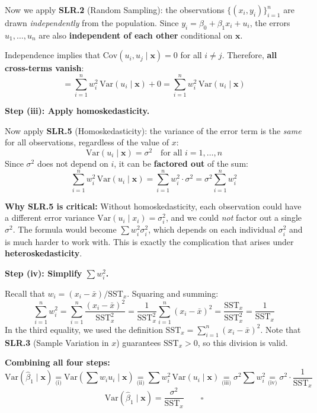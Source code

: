 \documentclass[11pt,a4paper]{article}
\begin{document}
\begin{enumerate}[label=(\alph*)]
\begin{solution}
Now we apply \textbf{SLR.2} (Random Sampling): the observations $\{(x_i, y_i)\}_{i=1}^n$ are drawn \emph{independently} from the population. Since $y_i = \beta_0 + \beta_1 x_i + u_i$, the errors $u_1, \ldots, u_n$ are also \textbf{independent of each other} conditional on $\mathbf{x}$.

Independence implies that $\text{Cov}(u_i, u_j \mid \mathbf{x}) = 0$ for all $i \ne j$. Therefore, \textbf{all cross-terms vanish}:
\[
  = \sum_{i=1}^n w_i^2\,\text{Var}(u_i \mid \mathbf{x}) + 0
  = \sum_{i=1}^n w_i^2\,\text{Var}(u_i \mid \mathbf{x})
\]

\bigskip

\textbf{Step (iii): Apply homoskedasticity.}

Now apply \textbf{SLR.5} (Homoskedasticity): the variance of the error term is the \emph{same} for all observations, regardless of the value of $x$:
\[
  \text{Var}(u_i \mid \mathbf{x}) = \sigma^2 \quad\text{for all } i = 1, \ldots, n
\]
Since $\sigma^2$ does not depend on $i$, it can be \textbf{factored out} of the sum:
\[
  \sum_{i=1}^n w_i^2\,\text{Var}(u_i \mid \mathbf{x})
  = \sum_{i=1}^n w_i^2 \cdot \sigma^2
  = \sigma^2 \sum_{i=1}^n w_i^2
\]

\textcolor{warncolor}{\textbf{Why SLR.5 is critical:}} Without homoskedasticity, each observation could have a different error variance $\text{Var}(u_i \mid x_i) = \sigma_i^2$, and we could \emph{not} factor out a single $\sigma^2$. The formula would become $\sum w_i^2 \sigma_i^2$, which depends on each individual $\sigma_i^2$ and is much harder to work with. This is exactly the complication that arises under \textbf{heteroskedasticity}.

\bigskip

\textbf{Step (iv): Simplify $\sum w_i^2$.}

Recall that $w_i = (x_i - \bar{x})/\text{SST}_x$. Squaring and summing:
\[
  \sum_{i=1}^n w_i^2
  = \sum_{i=1}^n \frac{(x_i - \bar{x})^2}{\text{SST}_x^2}
  = \frac{1}{\text{SST}_x^2} \sum_{i=1}^n (x_i - \bar{x})^2
  = \frac{\text{SST}_x}{\text{SST}_x^2}
  = \frac{1}{\text{SST}_x}
\]
In the third equality, we used the definition $\text{SST}_x = \sum_{i=1}^n (x_i - \bar{x})^2$. Note that \textbf{SLR.3} (Sample Variation in $x$) guarantees $\text{SST}_x > 0$, so this division is valid.

\bigskip

\textbf{Combining all four steps:}
\[
  \text{Var}(\hat{\beta}_1 \mid \mathbf{x})
  \underset{\text{(i)}}{=} \text{Var}\!\left(\sum w_i u_i \mid \mathbf{x}\right)
  \underset{\text{(ii)}}{=} \sum w_i^2\,\text{Var}(u_i \mid \mathbf{x})
  \underset{\text{(iii)}}{=} \sigma^2 \sum w_i^2
  \underset{\text{(iv)}}{=} \sigma^2 \cdot \frac{1}{\text{SST}_x}
\]
\[
  \boxed{\text{Var}(\hat{\beta}_1 \mid \mathbf{x}) = \frac{\sigma^2}{\text{SST}_x}} \qquad\square
\]


\end{solution}
\end{enumerate}
\end{document}
